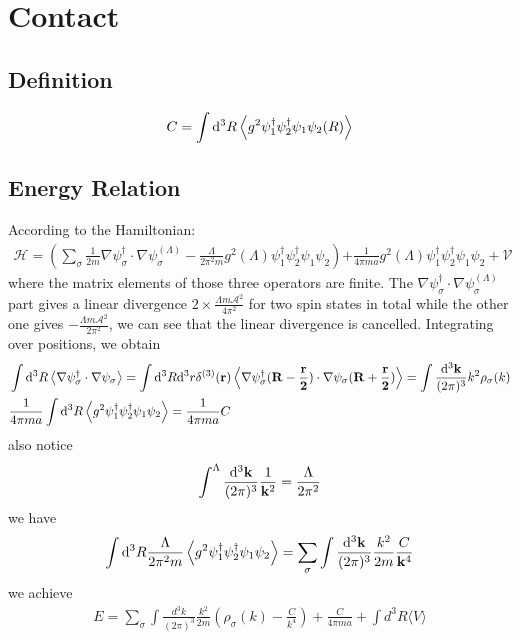 \documentclass{article}
\newcommand{\calA}{\mathcal{A}}
\newcommand{\mme}[1]{\frac{\dd^3\vb{#1}}{(2\pi)^3}}
\begin{document}
\section{Contact}
\subsection{Definition}
\begin{align}
	C=\int\dd^3R\expval{g^2\psi^\dagger_1\psi^\dagger_2\psi_1\psi_2(R)}
	\label{contact}
\end{align}
\subsection{Energy Relation}
According to the Hamiltonian:
\begin{align}
	\mathcal{H} = \left(\sum_{\sigma} \frac {1} {2 m} \nabla \psi_{\sigma}^{\dagger} \cdot \nabla \psi_{\sigma}^{(\Lambda)} - \frac {\Lambda} {2 \pi^{2} m} g^{2}(\Lambda) \psi_{1}^{\dagger} \psi_{2}^{\dagger} \psi_{1} \psi_{2}\right){+ \frac {1} {4 \pi m a} g^{2}(\Lambda) \psi_{1}^{\dagger} \psi_{2}^{\dagger} \psi_{1} \psi_{2} + \mathcal{V}}
\end{align}
where the matrix elements of those three operators are finite. The $\nabla \psi_{\sigma}^{\dagger} \cdot \nabla \psi_{\sigma}^{(\Lambda)}$ part gives a linear divergence $2\times\frac{\Lambda  m\calA^2}{4 \pi ^2}$ for two spin states in total while the other one gives $-\frac{\Lambda m\calA^2}{2\pi^2}$, we can see that the linear divergence is cancelled. Integrating over positions, we obtain
\begin{align}
	  & \int\dd^3R\expval{\nabla \psi_{\sigma}^{\dagger} \cdot \nabla \psi_{\sigma}}=\int\dd^3R\dd^3r\delta^{(3)}(\vb{r})\expval{\nabla \psi_{\sigma}^{\dagger}(\vb{R-\frac{r}{2}}) \cdot \nabla \psi_{\sigma}(\vb{R+\frac{r}{2}})} =\int\mme{k}k^2\rho_\sigma(k) \\
	  & \frac {1} {4 \pi m a} \int\dd^3R \expval{g^{2}\psi_{1}^{\dagger} \psi_{2}^{\dagger} \psi_{1} \psi_{2}}=\frac {1} {4 \pi m a}C
\end{align}
also notice
\begin{align}
	\int^\Lambda\mme{k}\frac{1}{\vb{k}^2}=\frac{\Lambda}{2\pi^2}
\end{align}
we have
\begin{align}
	\int\dd^3R\frac {\Lambda} {2 \pi^{2} m} \expval{g^{2} \psi_{1}^{\dagger} \psi_{2}^{\dagger} \psi_{1} \psi_{2}}=\sum_\sigma\int\mme{k}\frac{k^2}{2m}\frac{C}{\vb{k}^4}
\end{align}
we achieve
\begin{align}
	E = \sum_{\sigma} \int \frac {d^{3} k} {(2 \pi)^{3}} \frac {k^{2}} {2 m} \left(\rho_{\sigma} (k) - \frac {C} {k^{4}}\right) + \frac {C} {4 \pi m a}+ \int d^{3} R \langle V \rangle
\end{align}
\end{document}
